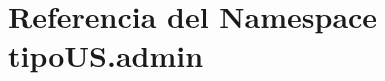 \hypertarget{namespacetipo_u_s_1_1admin}{}\section{Referencia del Namespace tipo\+U\+S.\+admin}
\label{namespacetipo_u_s_1_1admin}
